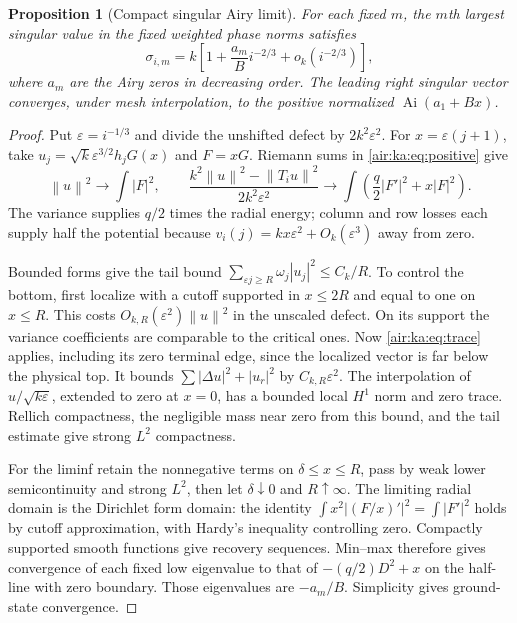 \documentclass[11pt,letterpaper]{article}
\numberwithin{equation}{section}
\newtheorem{proposition}[theorem]{Proposition}
\theoremstyle{remark}
\newcommand{\Ai}{\operatorname{Ai}}
\newcommand{\norm}[1]{\left\lVert#1\right\rVert}
\newcommand{\eps}{\varepsilon}
\begin{document}
\begin{proposition}[Compact singular Airy limit]\label{air:ka:prop:singular}
For each fixed $m$, the $m$th largest singular value in the fixed weighted phase norms satisfies
\[
 \sigma_{i,m}=k\left[1+\frac{a_m}{B}i^{-2/3}+o_k(i^{-2/3})\right],
\]
where $a_m$ are the Airy zeros in decreasing order. The leading right singular vector converges, under mesh interpolation, to the positive normalized $\Ai(a_1+Bx)$.
\end{proposition}
\begin{proof}
Put $\eps=i^{-1/3}$ and divide the unshifted defect by $2k^2\eps^2$. For $x=\eps(j+1)$, take $u_j=\sqrt{k}\eps^{3/2}h_jG(x)$ and $F=xG$. Riemann sums in \eqref{air:ka:eq:positive} give
\[
 \norm{u}^2\longrightarrow\int|F|^2,\qquad
 \frac{k^2\norm{u}^2-\norm{T_iu}^2}{2k^2\eps^2}
 \longrightarrow\int\left(\frac q2|F'|^2+x|F|^2\right).
\]
The variance supplies $q/2$ times the radial energy; column and row losses each supply half the potential because $v_i(j)=kx\eps^2+O_k(\eps^3)$ away from zero.

Bounded forms give the tail bound $\sum_{\eps j\ge R}\omega_j|u_j|^2\le C_k/R$. To control the bottom, first localize with a cutoff supported in $x\le2R$ and equal to one on $x\le R$. This costs $O_{k,R}(\eps^2)\norm{u}^2$ in the unscaled defect. On its support the variance coefficients are comparable to the critical ones. Now \eqref{air:ka:eq:trace} applies, including its zero terminal edge, since the localized vector is far below the physical top. It bounds $\sum|\Delta u|^2+|u_r|^2$ by $C_{k,R}\eps^2$. The interpolation of $u/\sqrt{k\eps}$, extended to zero at $x=0$, has a bounded local $H^1$ norm and zero trace. Rellich compactness, the negligible mass near zero from this bound, and the tail estimate give strong $L^2$ compactness.

For the liminf retain the nonnegative terms on $\delta\le x\le R$, pass by weak lower semicontinuity and strong $L^2$, then let $\delta\downarrow0$ and $R\uparrow\infty$. The limiting radial domain is the Dirichlet form domain: the identity $\int x^2|(F/x)'|^2=\int|F'|^2$ holds by cutoff approximation, with Hardy's inequality controlling zero. Compactly supported smooth functions give recovery sequences. Min--max therefore gives convergence of each fixed low eigenvalue to that of $-(q/2)D^2+x$ on the half-line with zero boundary. Those eigenvalues are $-a_m/B$. Simplicity gives ground-state convergence.
\end{proof}
\end{document}
